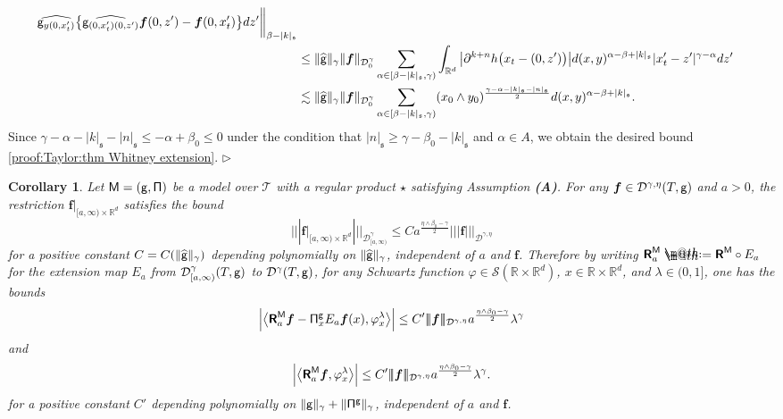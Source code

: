\documentclass[10pt, reqno]{amsart}
\makeatletter
\numberwithin{subsection}{section}
\numberwithin{subsubsection}{subsection}
\numberwithin{equation}{section} %
\newenvironment{Dem}[1][\unskip]{%
    \begin{list}{\hspace{1.15cm}{\sf \textbf{{\small Proof #1 --}}}}{%
        \setlength{\topsep}{0pt}%
        \setlength{\leftmargin}{0pt}%
        \setlength{\rightmargin}{0pt}%
        \setlength{\listparindent}{0pt}%
        \setlength{\itemindent}{0pt}%
        \setlength{\parsep}{0pt}%
        \addtolength{\leftmargin}{0pt}%
        \addtolength{\rightmargin}{0pt}%
    } \item }{\hfill $\rhd$\end{list}\smallskip}
\theoremstyle{mystyle}
\newtheorem{cor}[thm]{\hspace{-0.15cm}  {Corollary} }%
\theoremstyle{mystyle2}
\theoremstyle{mystyle3}
\newcommand{\REFA}{\textbf{\textsf{(A)}}}
\newcommand{\trino}[1]{|\!|\!|#1|\!|\!|}
\newcommand{\bsf}{\boldsymbol{f}}
\newcommand{\mfs}{\mathfrak{s}}
\newcommand\bbR{\mathbb{R}}
\newcommand{\mcD}{\mathcal{D}}
\newcommand\mcS{\mathcal{S}}
\newcommand*{\defeq}{\mathrel{\rlap{%
                     \raisebox{0.3ex}{$\m@th\cdot$}}%
                     \raisebox{-0.3ex}{$\m@th\cdot$}}%
                     =}
\makeatother
\begin{document}
\begin{Dem}
\begin{align*}
\widehat{{\sf g}_{y(0,x_t')}}\big\{\widehat{{\sf g}_{(0,x_t')(0,z')}}\bsf(0,z')-\bsf(0,x_t')\big\}
dz'\bigg\|_{\beta-|k|_\mfs}\\
&\le\|\widehat{\sf g}\|_\gamma\|\bsf\|_{\mcD_0^\gamma}\sum_{\alpha\in[\beta-|k|_\mfs,\gamma)}\int_{\bbR^d}\big|\partial^{k+n}h\big(x_t-(0,z')\big)\big|
d(x,y)^{\alpha-\beta+|k|_\mfs}|x_t'-z'|^{\gamma-\alpha}dz'\\
&\lesssim\|\widehat{\sf g}\|_\gamma\|\bsf\|_{\mcD_0^\gamma}\sum_{\alpha\in[\beta-|k|_\mfs,\gamma)}
(x_0\wedge y_0)^{\frac{\gamma-\alpha-|k|_\mfs-|n|_\mfs}2}d(x,y)^{\alpha-\beta+|k|_\mfs}.
\end{align*}
Since $\gamma-\alpha-|k|_\mfs-|n|_\mfs\le-\alpha+\beta_0\le0$ under the condition that $|n|_\mfs\ge\gamma-\beta_0-|k|_\mfs$ and $\alpha\in A$, we obtain the desired bound \eqref{proof:Taylor:thm Whitney extension}.
\end{Dem}

\medskip

\begin{cor}\label{cor:thm singular reconstruction}
Let $\sf M=(g,\Pi)$ be a model over $\mathscr{T}$ with a regular product $\star$ satisfying Assumption \REFA.
For any $\bsf\in\mcD^{\gamma,\eta}(T,{\sf g})$ and $a>0$, the restriction $\bsf\vert_{[a,\infty)\times\bbR^d}$ satisfies the bound
$$
\trino{\bsf\vert_{[a,\infty)\times\bbR^d}}_{\mcD_{[a,\infty)}^\gamma}\le Ca^{\frac{\eta\wedge\beta_0-\gamma}2}\trino{\bsf}_{\mcD^{\gamma,\eta}}
$$
for a positive constant $C=C(\|\widehat{\sf g}\|_\gamma)$ depending polynomially on $\|\widehat{\sf g}\|_\gamma$, independent of $a$ and $\bsf$.
Therefore by writing $\textbf{\textsf{R}}_a^{\sf M}\defeq \textbf{\textsf{R}}^{\sf M}\circ E_a$ for the extension map $E_a$ from $\mcD_{[a,\infty)}^\gamma(T,{\sf g})$ to $\mcD^\gamma(T,{\sf g})$, for any Schwartz function $\varphi\in\mcS(\bbR\times\bbR^d)$, $x\in\bbR\times\bbR^d$, and $\lambda\in(0,1]$, one has the bounds
\begin{equation}\label{proof:eq1:cor:thm singular reconstruction}
\left|\big\langle \textbf{\textsf{R}}_a^{\sf M}\bsf-{\sf\Pi}_x^{\sf g}E_a\bsf(x),\varphi_x^\lambda \big\rangle\right|
\le C'\trino{\bsf}_{\mcD^{\gamma,\eta}}a^{\frac{\eta\wedge\beta_0-\gamma}2}\lambda^\gamma
\end{equation}
and
\begin{equation}\label{proof:eq2:cor:thm singular reconstruction}
\left|\big\langle \textbf{\textsf{R}}_a^{\sf M}\bsf,\varphi_x^\lambda \big\rangle\right|
\le C'\trino{\bsf}_{\mcD^{\gamma,\eta}}a^{\frac{\eta\wedge\beta_0-\gamma}2}\lambda^\gamma.
\end{equation}
for a positive constant $C'$ depending polynomially on $\|{\sf g}\|_\gamma+\|{\sf\Pi}^{\sf g}\|_\gamma$, independent of $a$ and $\bsf$.
\end{cor}
\end{document}
